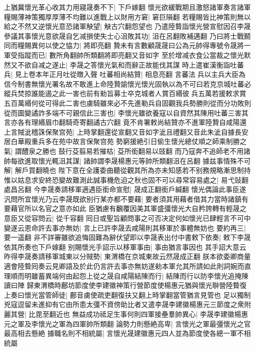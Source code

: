 上猶冀懷光革心收其力用寢晟奏不下|{
	下戶嫁翻}
懷光欲緩戰期且激怒諸軍奏言諸軍糧賜薄神策獨厚厚薄不均難以進戰上以財用方窘|{
	窘巨隕翻}
若糧賜皆比神策則無以給之不然又逆懷光意恐諸軍觖望|{
	觖古穴翻怨望也}
乃遣陸䞇詣懷光營宣慰因召李晟參議其事懷光意欲晟自乞减損使失士心沮敗其功|{
	沮在呂翻敗補邁翻}
乃曰將士戰鬭同而糧賜異何以使之恊力|{
	將即亮翻}
贄未有言數顧晟晟曰公為元帥得專號令晟將一軍受指蹤而已|{
	數所角翻帥所類翻將即亮翻又音如字}
至於增减衣食公當裁之懷光默然又不欲自减之遂止|{
	李晟之答懷光氣和而辭正故能伐其謀}
時上遣崔漢衡詣吐蕃兵|{
	見上卷本年正月吐從暾入聲}
吐蕃相尚結贊|{
	相息亮翻}
言蕃法兵以主兵大臣為信今制書無懷光署名故不敢進上命陸贄諭懷光懷光固執以為不可曰若克京城吐蕃必縱兵焚掠誰能遏之此一害也前有勑旨募士卒克城者人賞百緡彼兵五萬若援敕求賞五百萬緡何從可得此二害也虜騎雖來必不先進勒兵自固觀我兵勢勝則從而分功敗則從而圖變譎詐多端不可親信此三害也|{
	李懷光雖欲養寇以自資然其陳用吐蕃三害其言亦各有理緡眉巾翻騎奇寄翻譎古穴翻}
竟不肯署敕尚結贊亦不進軍陸贄自咸陽還上言賊泚稽誅保聚宫苑|{
	上時掌翻還從宣翻又音如字泚且禮翻又音此朱泚自據長安居白華殿重兵多在苑中故言保聚宫苑}
勢窮援絶引日偷生懷光總仗順之師乘制勝之氣|{
	謂醴泉之勝也}
鼓行芟翦易若摧枯|{
	芟所銜翻易以豉翻}
而乃寇奔不追師老不用諸帥每欲進取懷光輒沮其謀|{
	諸帥謂李晟楊惠元等帥所類翻沮在呂翻}
據兹事情殊不可解|{
	解戶買翻曉也}
陛下意在全護委曲聽從觀其所為亦未知感若不别務規略漸思制持惟以姑息求安終恐變故難測此誠事機危迫之秋也固不可以尋常容易處之|{
	易弋䜴翻處昌呂翻}
今李晟奏請移軍適遇臣銜命宣慰|{
	晟成正翻銜戶緘翻}
懷光偶論此事臣遂汎問所宜懷光乃云李晟既欲别行某亦都不要藉|{
	要者須其用藉者借其力當時諸鎮有要藉官所以名官之意亦如此}
臣猶慮有飜覆因美其軍盛彊懷光大自矜誇轉有輕晟之意臣又從容問云|{
	從千容翻}
囘日或聖旨顧問事之可否决定何如懷光已肆輕言不可中變遂云恩命許去事亦無妨|{
	言上已許李晟去咸陽則其移軍於事體無妨也}
要約再三|{
	要一遥翻}
非不詳審雖欲追悔固難為辭伏望即以李晟表出付中書敕下依奏|{
	敕下李晟依其所奏也下戶嫁翻}
别賜懷光手詔示以移軍事由|{
	事由猶言事因也}
其手詔大意云昨得李晟奏請移軍城東以分賊勢|{
	東渭橋在京城東故云然晟成正翻}
朕本欲委卿商量適會陸䞇囘奏云見卿語及於此仍言許去事亦無妨遂勑本軍允其所請如此則詞婉而直理順而明雖蓄異端何由起怨上從之晟自咸陽結陳而行|{
	結陳而行以防李懷光追掩陳讀曰陣}
歸東渭橋時鄜坊節度使李建徽神策行營節度使楊惠元猶與懷光聨營陸䞇復上奏曰懷光當管師徒|{
	鄜音虜使疏吏翻復扶又翻上時掌翻當管猶言見管也}
足以獨制兇寇逗留未進抑有它由所患太彊不資傍助比者又遣李晟李建徽楊惠元三節度之衆附麗其營|{
	比毘至翻近也}
無益成功祗足生事何則四軍接壘羣帥異心|{
	李晟李建徽楊惠元之軍及李懷光之軍為四軍帥所類翻}
論勢力則懸絶高卑|{
	言懷光之軍最彊懷光之官最高相去懸絶}
據職名則不相統屬|{
	言懷光晟建徽惠元四人並為節度使各總一軍不相統屬}

